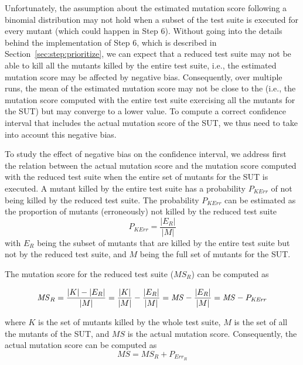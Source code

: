 Unfortunately, the assumption about the estimated mutation score following a binomial distribution may not hold when a subset of the test suite is executed for every mutant (which could happen in Step 6). Without going into the details behind the implementation of Step 6, which is described in Section~\ref{sec:step:prioritize},
we can expect that a reduced test suite may not be able to kill all the mutants killed by the entire test suite, i.e., the estimated mutation score may be affected by negative bias. Consequently, over multiple runs, the mean of the estimated mutation score may not be close to the  (i.e., the mutation score computed with the entire test suite exercising all the mutants for the SUT)
 but may converge to a lower value.
To compute a correct confidence interval that includes the actual mutation score of the SUT, we thus need to take into account this negative bias.

To study the effect of negative bias on the confidence interval, we address first the relation between the actual mutation score and the mutation score computed with the reduced test suite when the entire set of mutants for the SUT is executed.
A mutant killed by the entire test suite has a probability $P_{\mathit{KErr}}$ of not being killed by the reduced test suite.
The probability $P_{\mathit{KErr}}$  can be estimated as the proportion of mutants (erroneously) not killed by the reduced test suite
\begin{equation}
P_{\mathit{KErr}} = \frac{|E_R|}{|M|}
\end{equation}
with
$E_R$ being the subset of mutants that are killed by the entire test suite but not by the reduced test suite, and $M$ being the full set of mutants for the SUT.

The mutation score for the reduced test suite ($\mathit{MS}_R$) can be computed as

\begin{equation}
\small
\mathit{MS}_R=\frac{|K|-|E_R|}{|M|}=\frac{|K|}{|M|}-\frac{|E_R|}{|M|}=\mathit{MS}-\frac{|E_R|}{|M|}=\mathit{MS}-P_{\mathit{KErr}}
\end{equation}

where $K$ is the set of mutants killed by the whole test suite, $M$ is the set of all the mutants of the SUT,  and $\mathit{MS}$ is the actual mutation score. Consequently, the actual mutation score can be computed as
\begin{equation}
\label{eq:MS}
\mathit{MS}=\mathit{MS}_R+P_{\mathit{Err}_R}
\end{equation}

